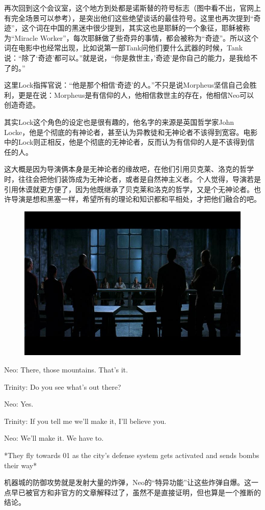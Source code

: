 \documentclass[UTF8]{ctexart}
\newenvironment{myquote}{\color{green} \setlength{\leftskip}{6em} \setlength{\rightskip}{4em} \setlength{\parindent}{-2em}}{\par}
\begin{document}
再次回到这个会议室，这个地方到处都是诺斯替的符号标志（图中看不出，官网上有完全场景可以参考），是突出他们这些绝望谈话的最佳符号。这里也再次提到“奇迹”，这个词在中国的黑迷中很少提到，其实这也是耶稣的一个象征，耶稣被称为“Miracle Worker”，每次耶稣做了些奇异的事情，都会被称为“奇迹”。所以这个词在电影中也经常出现，比如说第一部Tank问他们要什么武器的时候，Tank说：“除了‘奇迹’都可以。”就是说，“你是救世主，’奇迹’是你自己的能力，是我给不了的。”

这里Lock指挥官说：“他是那个相信‘奇迹’的人。”不只是说Morpheus坚信自己会胜利，更是在说：Morpheus是有信仰的人，他相信救世主的存在，他相信Neo可以创造奇迹。

其实Lock这个角色的设定也是很有趣的，他名字的来源是英国哲学家John Locke，他是个彻底的有神论者，甚至认为异教徒和无神论者不该得到宽容。电影中的Lock则正相反，他是个彻底的无神论者，反而认为有信仰的人是不该得到信任的人。

这大概是因为导演俩本身是无神论者的缘故吧，在他们引用贝克莱、洛克的哲学时，往往会把他们装饰成为无神论者，或者是自然神主义者。个人觉得，导演若是引用休谟就更方便了，因为他既继承了贝克莱和洛克的哲学，又是个无神论者。也许导演是想和黑塞一样，希望所有的理论和知识都和平相处，才把他们融合的吧。

\begin{figure}[htb]
\centering
\includegraphics[width=0.5\linewidth]{fig/9d98503db2184bef3d6d9797.jpg}
\end{figure}

\begin{myquote}
Neo: There, those mountains. That's it.

Trinity: Do you see what's out there?

Neo: Yes.

Trinity: If you tell me we'll make it, I'll believe you.

Neo: We'll make it. We have to.

*They fly towards 01 as the city's defense system gets activated and sends bombs their way*
\end{myquote}

机器城的防御攻势就是发射大量的炸弹，Neo的“特异功能”让这些炸弹自爆。这一点早已被官方和非官方的文章解释过了，虽然不是直接证明，但也算是一个推断的结论。
\end{document}
